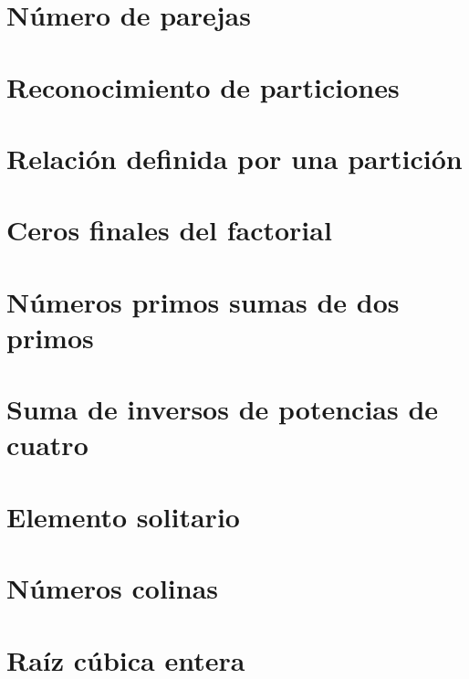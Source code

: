 \documentclass[a4paper,12pt,twoside]{book}
\begin{document}
\chapter{Número de parejas}

\chapter{Reconocimiento de particiones}

\chapter{Relación definida por una partición}

\chapter{Ceros finales del factorial}

 
\chapter{Números primos sumas de dos primos}

\chapter{Suma de inversos de potencias de cuatro}

\chapter{Elemento solitario}

\chapter{Números colinas}

\chapter{Raíz cúbica entera}

\end{document}
